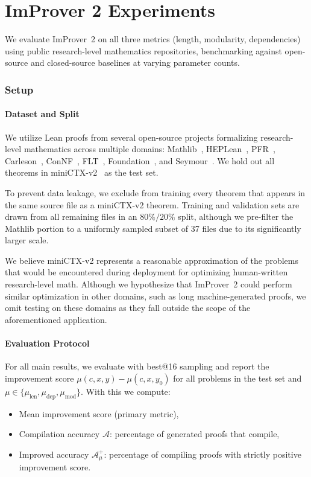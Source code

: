 \chapter{ImProver 2 Experiments}\label{chap:improver2-exp}

We evaluate ImProver~2 on all three metrics (length, modularity, dependencies) using public research-level mathematics repositories, benchmarking against open-source and closed-source baselines at varying parameter counts.

\subsection{Setup}
\label{sec:exp_setup}

\subsubsection{Dataset and Split}

We utilize Lean proofs from several open-source projects formalizing research-level mathematics across multiple domains: Mathlib~\cite{Mathlib}, HEPLean~\cite{HEPLean}, PFR~\cite{PFR}, Carleson~\cite{Carleson}, ConNF~\cite{ConNF}, FLT~\cite{FLT}, Foundation~\cite{Foundation}, and Seymour~\cite{Seymour}. We hold out all theorems in miniCTX-v2~\cite{hu2024minictxneuraltheoremproving} as the test set.

To prevent data leakage, we exclude from training every theorem that appears in the same source file as a miniCTX-v2 theorem. Training and validation sets are drawn from all remaining files in an $80\%/20\%$ split, although we pre-filter the Mathlib portion to a uniformly sampled subset of 37 files due to its significantly larger scale.

We believe miniCTX-v2 represents a reasonable approximation of the problems that would be encountered during deployment for optimizing human-written research-level math. Although we hypothesize that ImProver~2 could perform similar optimization in other domains, such as long machine-generated proofs, we omit testing on these domains as they fall outside the scope of the aforementioned application.

\subsubsection{Evaluation Protocol}

For all main results, we evaluate with best@16 sampling and report the improvement score $\mu(c,x,y) - \mu(c,x,y_0)$ for all problems in the test set and $\mu \in \{\mu_{\mathrm{len}}, \mu_{\mathrm{dep}}, \mu_{\mathrm{mod}}\}$. With this we compute:
\begin{itemize}
    \item Mean improvement score (primary metric),
    \item Compilation accuracy $\mathcal{A}$: percentage of generated proofs that compile,
    \item Improved accuracy $\mathcal{A}^+_\mu$: percentage of compiling proofs with strictly positive improvement score.
\end{itemize}

